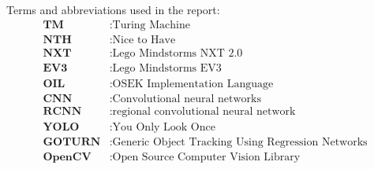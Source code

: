 
Terms and abbreviations used in the report:
\begin{align*}
	\textbf{TM} &: \text{Turing Machine} \\
    \textbf{NTH} &: \text{Nice to Have} \\
    \textbf{NXT} &: \text{Lego Mindstorms NXT 2.0} \\
    \textbf{EV3} &: \text{Lego Mindstorms EV3} \\  
    \textbf{OIL} &: \text{OSEK Implementation Language} \\  
    \textbf{CNN} &: \text{Convolutional neural networks} \\ 
    \textbf{RCNN} &: \text{regional convolutional neural network} \\ 
    \textbf{YOLO} &: \text{You Only Look Once} \\ 
    \textbf{GOTURN} &: \text{Generic Object Tracking Using Regression Networks} \\
    \textbf{OpenCV} &: \text{Open Source Computer Vision Library} \\
\end{align*}
